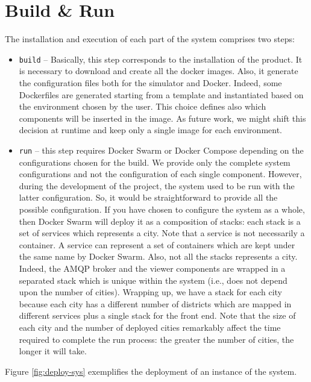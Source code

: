 \section{Build \& Run}
The installation and execution of each part of the system comprises two steps:

\begin{itemize}
   \item \texttt{build} --
   Basically, this step corresponds to the installation of the product.
   It is necessary to download and create all the docker
   images. Also, it generate the configuration files both for the simulator and
   Docker. Indeed, some Dockerfiles are generated starting from a template and
   instantiated based on the environment chosen by the user. This choice defines
   also which components will be inserted in the image. As future work,
   we might shift this decision at runtime and keep only a single image for each
   environment.
   \item \texttt{run} --
   this step requires Docker Swarm
	or Docker Compose depending on the configurations chosen for the build.
	We provide only the complete system configurations and not the
	configuration of each single component.
   However, during the development of the project,
	the system used to be run with the latter configuration.
	So, it would be straightforward to provide all the possible configuration.
	If you have chosen to configure the system as a whole, then Docker Swarm
   will deploy it as a composition of stacks:
   each stack is a set of services which represents
   a city. Note that a service is not necessarily a container.
   A service can represent a set of containers which are kept under the same
   name by Docker Swarm.
   Also, not all the stacks represents a city. Indeed, the AMQP broker
   and the viewer components are wrapped in a separated
   stack which is unique within the system (i.e., does not depend upon the
   number of cities). Wrapping up, we have a stack for each city because
   each city has a different number of districts which are mapped in different
   services plus a single stack for the front end.
   Note that the size of each city and the number of deployed
   cities remarkably affect the time required to complete the run process:
   the greater the number of cities, the longer it will take.
\end{itemize}

Figure \ref{fig:deploy-sys} exemplifies the deployment of an instance of the
system.

